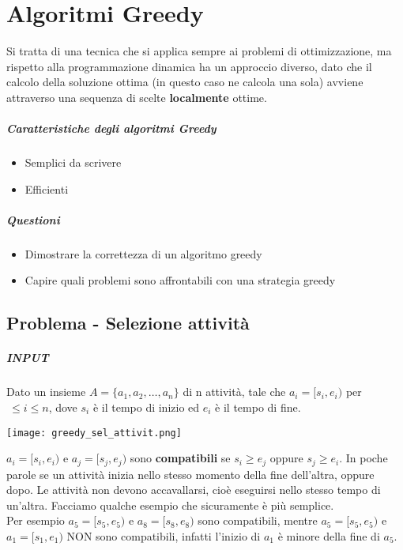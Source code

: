 \chapter{Algoritmi Greedy}
Si tratta di una tecnica che si applica sempre ai problemi di ottimizzazione, ma
rispetto alla programmazione dinamica ha un approccio diverso, dato che il calcolo della
soluzione ottima (in questo caso ne calcola una sola) avviene attraverso una
sequenza di scelte \textbf{localmente} ottime.
\paragraph*{Caratteristiche degli algoritmi Greedy}
\begin{itemize}
    \item Semplici da scrivere
    \item Efficienti
\end{itemize}
\paragraph*{Questioni}
\begin{itemize}
    \item Dimostrare la correttezza di un algoritmo greedy
    \item Capire quali problemi sono affrontabili con una strategia greedy
\end{itemize}
\section{Problema - Selezione attività}
\paragraph*{INPUT} Dato un insieme $A = \{a_1, a_2, \dots, a_n\}$ di n attività, tale
che $a_i = [s_i, e_i)$ per $\ \leq i \leq n$, dove $s_i$ è il tempo di inizio ed $e_i$ è il
tempo di fine.
\begin{center}
    \texttt{[image: greedy\_sel\_attivit.png]}
\end{center}
$a_i=[s_i, e_i)$ e $a_j = [s_j, e_j)$ sono \textbf{compatibili} se $s_i \geq e_j$ oppure 
$s_j \geq e_i$. In poche parole se un attività inizia nello stesso momento della fine dell'altra, oppure dopo.
Le attività non devono accavallarsi, cioè eseguirsi nello stesso tempo di un'altra.
Facciamo qualche esempio che sicuramente è più semplice.\\
Per esempio $a_5=[s_5, e_5)$ e $a_8 = [s_8, e_8)$ sono compatibili, mentre $a_5 = [s_5, e_5)$ e 
$a_1 = [s_1, e_1)$ NON sono compatibili, infatti l'inizio di $a_1$ è minore della fine di $a_5$.
